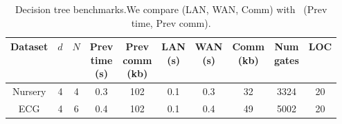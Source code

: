 





\setlength\tabcolsep{3.8pt}

\begin{table}[t]
\footnotesize
\begin{tabular}{|c|c|c|c|c|c|c|c|c|c|}
\hline
Dataset  & $d$ & $N$ & \thead{Prev \\ time\\ (s)} & \thead{Prev \\ comm\\ (kb)} & \thead{LAN  \\ (s)} & \thead{WAN\\ (s)} & \thead{Comm \\(kb)}& \thead{Num \\ gates} & LOC\\
\hline
Nursery & 4 & 4 & 0.3 & 102 & 0.1 & 0.3 & 32 & 3324 & 20\\
\hline
ECG & 4 &  6 & 0.4 & 102 & 0.1 & 0.4 & 49  & 5002 & 20\\
\hline
\end{tabular}
\caption{Decision tree benchmarks.We compare \tool (LAN, WAN, Comm)
 with~\cite{wu} (Prev time, Prev comm).}
 \label{tab:dt} 
\end{table}


